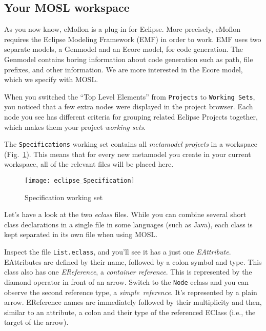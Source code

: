 \newpage
\texHeader
\hypertarget{projectStructure tex}{}
\subsection{Your MOSL workspace}

As you now know, eMoflon is a plug-in for Eclipse. More precisely, eMoflon requires the Eclipse Modeling Framework (EMF) in order to work. EMF uses two separate
models, a Genmodel and an Ecore model, for code generation. The Genmodel contains boring information about code generation such as path, file prefixes, and
other information. We are more interested in the Ecore model, which we specify with MOSL.

When you switched the ``Top Level Elements'' from \texttt{Projects} to \texttt{Working Sets}, you noticed that a few extra nodes were displayed in the project
browser. Each node you see has different criteria for grouping related Eclipse Projects together, which makes them your project \emph{working sets}.

The \texttt{Specifications} working set contains all \emph{metamodel projects} in a workspace (Fig.~\ref{fig_modelSpecification}). This means that for every
new metamodel you create in your current workspace, all of the relevant files will be placed here.

 \begin{figure}[htbp]
  \centering
  \texttt{[image: eclipse\_Specification]}
  \caption{Specification working set}
  \label{fig_modelSpecification}
\end{figure}
  
Let's have a look at the two \emph{eclass} files. While you can combine several short class declarations in a single file in some languages (such as Java),
each class is kept separated in its own file when using MOSL.

Inspect the file \texttt{List.eclass}, and you'll see it has a just one \emph{EAttribute}. EAttributes are defined by their name, followed by a colon
symbol and type. This class also has one \emph{EReference}, a \emph{container reference}. This is represented by the diamond operator in front of an arrow.
Switch to the \texttt{Node} eclass and you can observe the second reference type, a \emph{simple~reference}. It's represented by a plain arrow. EReference names are
immediately followed by their multiplicity and then, similar to an attribute, a colon and their type of the referenced EClass (i.e., the target of the arrow).

